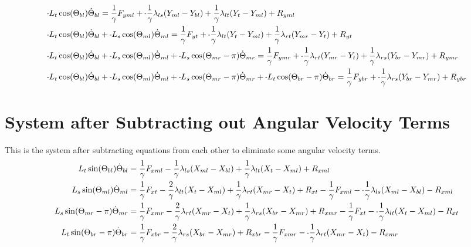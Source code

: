 \documentclass[11pt, landscape]{article}
\newcommand{\mn}{\scalebox{0.7}[1.0]{-}}
\begin{document}
\begin{align}
  &\mn L_{t}\cos(\Theta_{bl})  \dot{\Theta}_{bl} = \frac{1}{\gamma}F_{yml} + \mn \frac{1}{\gamma}\lambda_{ls}(Y_{ml} - Y_{bl}) + \frac{1}{\gamma}\lambda_{lt}(Y_{t } - Y_{ml}) + R_{yml} \\
  &\mn L_{t}\cos(\Theta_{bl})  \dot{\Theta}_{bl} + \mn L_{s}\cos(\Theta_{ml})  \dot{\Theta}_{ml}  = \frac{1}{\gamma}F_{yt } + \mn \frac{1}{\gamma}\lambda_{lt}(Y_{t } - Y_{ml}) + \frac{1}{\gamma}\lambda_{rt}(Y_{mr} - Y_{t }) + R_{yt } \\
  &\mn L_{t}\cos(\Theta_{bl})  \dot{\Theta}_{bl} + \mn L_{s}\cos(\Theta_{ml})  \dot{\Theta}_{ml} + \mn L_{s}\cos(\Theta_{mr}-\pi)  \dot{\Theta}_{mr} = \frac{1}{\gamma}F_{ymr} + \mn \frac{1}{\gamma}\lambda_{rt}(Y_{mr} - Y_{t }) + \frac{1}{\gamma}\lambda_{rs}(Y_{br} - Y_{mr}) + R_{ymr} \\
  &\mn L_{t}\cos(\Theta_{bl})  \dot{\Theta}_{bl} + \mn L_{s}\cos(\Theta_{ml})  \dot{\Theta}_{ml} + \mn L_{s}\cos(\Theta_{mr}-\pi)  \dot{\Theta}_{mr} + \mn L_{t}\cos(\Theta_{br}-\pi)  \dot{\Theta}_{br} = \frac{1}{\gamma}F_{ybr} + \mn \frac{1}{\gamma}\lambda_{rs}(Y_{br} - Y_{mr}) + R_{ybr}
\end{align}


\section{System after Subtracting out Angular Velocity Terms}
This is the system after subtracting equations from each other to eliminate some angular velocity terms.\\

\begin{align}
  L_{t}\sin(\Theta_{bl})      \dot{\Theta}_{bl} &= \frac{1}{\gamma}F_{xml} - \frac{1}{\gamma}\lambda_{ls}(X_{ml} - X_{bl}) + \frac{1}{\gamma}\lambda_{lt}(X_{t } - X_{ml}) + R_{xml} \\
  L_{s}\sin(\Theta_{ml})      \dot{\Theta}_{ml} &= \frac{1}{\gamma}F_{xt } - \frac{2}{\gamma}\lambda_{lt}(X_{t } - X_{ml}) + \frac{1}{\gamma}\lambda_{rt}(X_{mr} - X_{t }) + R_{xt } - \frac{1}{\gamma}F_{xml} - \mn\frac{1}{\gamma}\lambda_{ls}(X_{ml} - X_{bl}) - R_{xml} \\
  L_{s}\sin(\Theta_{mr}-\pi)  \dot{\Theta}_{mr} &= \frac{1}{\gamma}F_{xmr} - \frac{2}{\gamma}\lambda_{rt}(X_{mr} - X_{t }) + \frac{1}{\gamma}\lambda_{rs}(X_{br} - X_{mr}) + R_{xmr} - \frac{1}{\gamma}F_{xt } - \mn\frac{1}{\gamma}\lambda_{lt}(X_{t } - X_{ml}) - R_{xt } \\
  L_{t}\sin(\Theta_{br}-\pi)  \dot{\Theta}_{br} &= \frac{1}{\gamma}F_{xbr} - \frac{2}{\gamma}\lambda_{rs}(X_{br} - X_{mr}) + R_{xbr} - \frac{1}{\gamma}F_{xmr} - \mn\frac{1}{\gamma}\lambda_{rt}(X_{mr} - X_{t }) - R_{xmr} 
\end{align}
\end{document}

